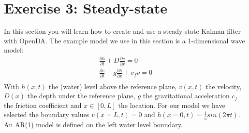\documentclass[a4paper,10pt]{article}
\begin{document}
\section{Exercise 3: Steady-state}
  In this section you will learn how to create and use a steady-state Kalman
  filter with OpenDA. The example model we use in this section is a
  1-dimensional wave model:
  \begin{eqnarray}
  \frac{\partial h}{\partial t} + D \frac{\partial v}{\partial x} = 0 \\
  \frac{\partial v}{\partial t} + g \frac{\partial h}{\partial x} + c_f v = 0 \\
  \end{eqnarray}
  With $h(x,t)$ the (water) level above the reference plane, $v(x,t)$ the
  velocity, $D(x)$ the depth under the reference plane, $g$ the gravitational
  acceleration $c_f$ the friction coefficient and $x\in [0,L]$ the location.
  For our model we have selected the boundary values $v(x=L,t)=0$ and
  $h(x=0,t)=\frac{1}{5} sin(2 \pi t)$. An AR(1) model is defined on the left
  water level boundary.
\end{document}
